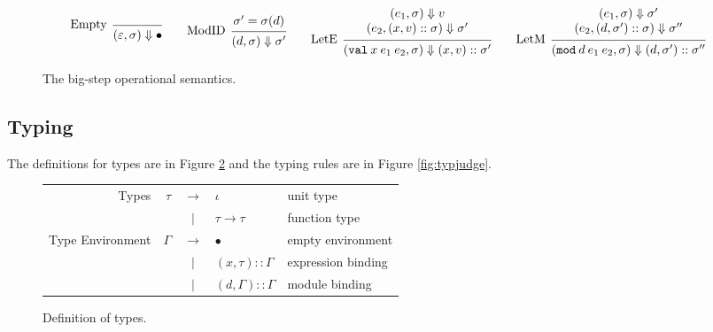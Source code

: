 \documentclass{article}
\theoremstyle{definition}
\newcommand*{\vbar}{|}
\newcommand*{\cons}{::}
\newcommand*{\modid}{d}
\newcommand*{\ctx}{\sigma}
\newcommand*{\semarrow}{\Downarrow}
\newcommand*{\Lete}{\mathtt{val}}
\newcommand*{\Letm}{\mathtt{mod}}
\begin{document}
\begin{figure}[h!]
  \[
    \begin{prooftree}
      \infer[left label=Empty]0{
      (\varepsilon, \ctx)
      \semarrow
      \bullet
      }
    \end{prooftree}\qquad
    \begin{prooftree}
      \hypo{\ctx'=\ctx(\modid)}
      \infer[left label=ModID]1{
      (\modid, \ctx)
      \semarrow
      \ctx'
      }
    \end{prooftree}\qquad
    \begin{prooftree}
      \hypo{
        \begin{matrix}
          (e_{1}, \ctx)
          \semarrow
          v \\
          (e_{2}, (x, v)\cons \ctx)
          \semarrow
          \ctx'
        \end{matrix}
      }
      \infer[left label=LetE]1{
      (\Lete\:x\:e_1\:e_2, \ctx)
      \semarrow
      (x,v)\cons\ctx'
      }
    \end{prooftree}\qquad
    \begin{prooftree}
      \hypo{
        \begin{matrix}
          (e_{1}, \ctx)
          \semarrow
          \ctx' \\
          (e_{2}, (\modid, \ctx')\cons \ctx)
          \semarrow
          \ctx''
        \end{matrix}
      }
      \infer[left label=LetM]1{
      (\Letm\:\modid\:e_{1}\:e_{2}, \ctx)
      \semarrow
      (\modid,\ctx')\cons\ctx''
      }
    \end{prooftree}
  \]
  \caption{The big-step operational semantics.}
  \label{fig:simpreach}
\end{figure}
\subsection{Typing}
The definitions for types are in Figure \ref{fig:typdom} and the typing rules are in Figure \ref{fig:typjudge}.

\begin{figure}[h!]
  \centering
  \begin{tabular}{rrcll}
    Types            & $\tau$   & $\rightarrow$ & $\iota$                       & unit type          \\
                     &          & $\vbar$       & $\tau\rightarrow\tau$         & function type      \\
    Type Environment & $\Gamma$ & $\rightarrow$ & $\bullet$                     & empty environment  \\
                     &          & $\vbar$       & $(x,\tau)\cons \Gamma$        & expression binding \\
                     &          & $\vbar$       & $(\modid,\Gamma)\cons \Gamma$ & module binding
  \end{tabular}
  \caption{Definition of types.}
  \label{fig:typdom}
\end{figure}
\end{document}

